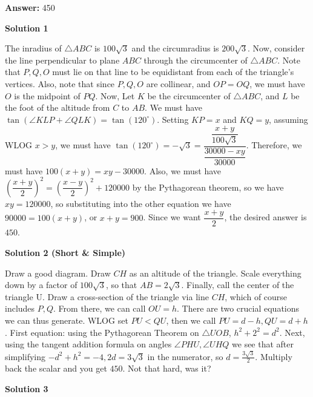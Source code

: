 \begin{enumerate}
 
 \textbf{Answer: }450



\textbf{Solution 1}

The inradius of $\triangle ABC$ is $100\sqrt 3$ and the circumradius is $200 \sqrt 3$. Now, consider the line perpendicular to plane $ABC$ through the circumcenter of $\triangle ABC$. Note that $P,Q,O$ must lie on that line to be equidistant from each of the triangle's vertices. Also, note that since $P, Q, O$ are collinear, and $OP=OQ$, we must have $O$ is the midpoint of $PQ$.  Now, Let $K$ be the circumcenter of $\triangle ABC$, and $L$ be the foot of the altitude from $C$ to $AB$. We must have $\tan(\angle KLP+ \angle QLK)= \tan(120^{\circ})$. Setting $KP=x$ and $KQ=y$, assuming WLOG $x>y$, we must have $\tan(120^{\circ})=-\sqrt{3}=\dfrac{\dfrac{x+y}{100 \sqrt{3}}}{\dfrac{30000-xy}{30000}}$. Therefore, we must have $100(x+y)=xy-30000$. Also, we must have $\left(\dfrac{x+y}{2}\right)^{2}=\left(\dfrac{x-y}{2}\right)^{2}+120000$ by the Pythagorean theorem, so we have $xy=120000$, so substituting into the other equation we have $90000=100(x+y)$, or $x+y=900$. Since we want $\dfrac{x+y}{2}$, the desired answer is $\boxed{450}$.

 



\textbf{Solution 2 (Short & Simple)}

Draw a good diagram. Draw $CH$ as an altitude of the triangle. Scale everything down by a factor of $100\sqrt{3}$, so that $AB=2\sqrt{3}$. Finally, call the center of the triangle U. Draw a cross-section of the triangle via line $CH$, which of course includes $P, Q$. From there, we can call $OU=h$. There are two crucial equations we can thus generate. WLOG set $PU<QU$, then we call $PU=d-h, QU=d+h$. First equation: using the Pythagorean Theorem on $\triangle UOB$, $h^2+2^2=d^2$. Next, using the tangent addition formula on angles $\angle PHU, \angle UHQ$ we see that after simplifying $-d^2+h^2=-4, 2d=3\sqrt{3}$ in the numerator, so $d=\frac{3\sqrt{3}}{2}$. Multiply back the scalar and you get $\boxed{450}$. Not that hard, was it?

 



\textbf{Solution 3}


\end{enumerate}
